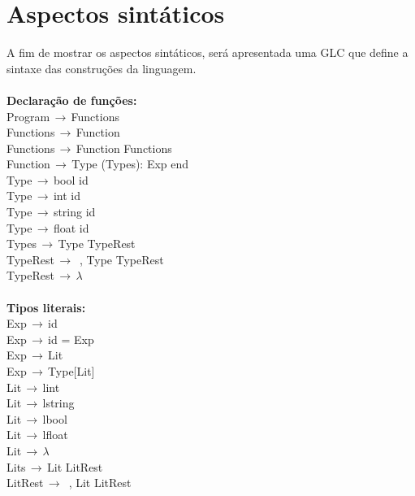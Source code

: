 \documentclass[letterpaper,12pt]{article}
\begin{document}
\section{Aspectos sint\'aticos}
A fim de mostrar os aspectos sint\'aticos, ser\'a apresentada uma GLC que define a sintaxe das constru\c{c}\~oes da linguagem.\\ 
\\
\textbf{Declara\c{c}\~ao de fun\c{c}\~oes:}\\            
Program$\,\to\,$Functions\\
Functions$\,\to\,$Function\\
Functions$\,\to\,$Function Functions\\
Function$\,\to\,$Type (Types): Exp end\\
Type$\,\to\,$bool id\\
Type$\,\to\,$int id\\
Type$\,\to\,$string id\\
Type$\,\to\,$float id\\
Types$\,\to\,$Type TypeRest\\
TypeRest$\,\to\,$ , Type TypeRest\\
TypeRest$\,\to\,$$\lambda$\\
\\
\textbf{Tipos literais:}\\
Exp$\,\to\,$id\\
Exp$\,\to\,$id = Exp\\
Exp$\,\to\,$Lit\\
Exp$\,\to\,$Type[Lit]\\
Lit$\,\to\,$lint\\
Lit$\,\to\,$lstring\\
Lit$\,\to\,$lbool\\
Lit$\,\to\,$lfloat\\
Lit$\,\to\,$$\lambda$\\
Lits$\,\to\,$Lit LitRest\\
LitRest$\,\to\,$ , Lit LitRest\\
\end{document}
